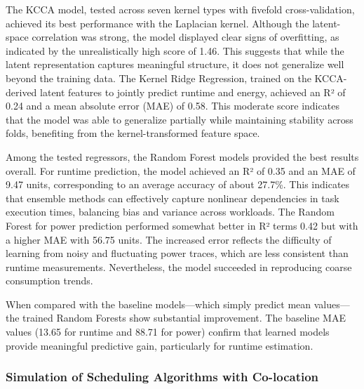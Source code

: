 The KCCA model, tested across seven kernel types with fivefold cross-validation, achieved its best performance with the Laplacian kernel. Although the latent-space correlation was strong, the model displayed clear signs of overfitting, as indicated by the unrealistically high score of 1.46. This suggests that while the latent representation captures meaningful structure, it does not generalize well beyond the training data.
The Kernel Ridge Regression, trained on the KCCA-derived latent features to jointly predict runtime and energy, achieved an R² of 0.24 and a mean absolute error (MAE) of 0.58. This moderate score indicates that the model was able to generalize partially while maintaining stability across folds, benefiting from the kernel-transformed feature space.

Among the tested regressors, the Random Forest models provided the best results overall. For runtime prediction, the model achieved an R² of 0.35 and an MAE of 9.47 units, corresponding to an average accuracy of about 27.7\%. This indicates that ensemble methods can effectively capture nonlinear dependencies in task execution times, balancing bias and variance across workloads. The Random Forest for power prediction performed somewhat better in R² terms 0.42 but with a higher MAE with 56.75 units. The increased error reflects the difficulty of learning from noisy and fluctuating power traces, which are less consistent than runtime measurements. Nevertheless, the model succeeded in reproducing coarse consumption trends.

When compared with the baseline models—which simply predict mean values—the trained Random Forests show substantial improvement. The baseline MAE values (13.65 for runtime and 88.71 for power) confirm that learned models provide meaningful predictive gain, particularly for runtime estimation.

\subsubsection{Simulation of Scheduling Algorithms with Co-location}
\label{sec:workflow_makespan_and_energy_consumption}

